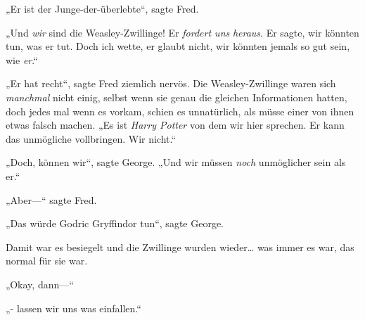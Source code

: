 „Er ist der Junge-der-überlebte“, sagte Fred.

„Und \emph{wir} sind die Weasley-Zwillinge! Er \emph{fordert uns} \emph{heraus}. Er sagte, wir könnten tun, was er tut. Doch ich wette, er glaubt nicht, wir könnten jemals so gut sein, wie \emph{er}.“

„Er hat recht“, sagte Fred ziemlich nervös. Die Weasley-Zwillinge waren sich \emph{manchmal} nicht einig, selbst wenn sie genau die gleichen Informationen hatten, doch jedes mal wenn es vorkam, schien es unnatürlich, als müsse einer von ihnen etwas falsch machen. „Es ist \emph{Harry Potter} von dem wir hier sprechen. Er kann das unmögliche vollbringen. Wir nicht.“

„Doch, können wir“, sagte George. „Und wir müssen \emph{noch} unmöglicher sein als er.“

„Aber—“ sagte Fred.

„Das würde Godric Gryffindor tun“, sagte George.

Damit war es besiegelt und die Zwillinge wurden wieder… was immer es war, das normal für sie war.

„Okay, dann—“

„- lassen wir uns was einfallen.“

